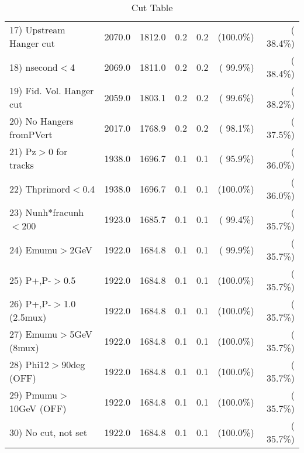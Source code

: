 \begin{table}[h!]
\begin{tabular}{||l||r|r|r|r|r|r||}
 17) Upstream Hanger cut  &       2070.0 &       1812.0 &          0.2 &          0.2 & (100.0\%) & ( 38.4\%) \\
 18) nsecond$<$4          &       2069.0 &       1811.0 &          0.2 &          0.2 & ( 99.9\%) & ( 38.4\%) \\
 19) Fid. Vol. Hanger cut &       2059.0 &       1803.1 &          0.2 &          0.2 & ( 99.6\%) & ( 38.2\%) \\
 20) No Hangers fromPVert &       2017.0 &       1768.9 &          0.2 &          0.2 & ( 98.1\%) & ( 37.5\%) \\
 21) Pz$>$0 for tracks    &       1938.0 &       1696.7 &          0.1 &          0.1 & ( 95.9\%) & ( 36.0\%) \\
 22) Thprimord$<$0.4      &       1938.0 &       1696.7 &          0.1 &          0.1 & (100.0\%) & ( 36.0\%) \\
 23) Nunh*fracunh$<$200   &       1923.0 &       1685.7 &          0.1 &          0.1 & ( 99.4\%) & ( 35.7\%) \\
 24) Emumu$>$2GeV         &       1922.0 &       1684.8 &          0.1 &          0.1 & ( 99.9\%) & ( 35.7\%) \\
 25) P+,P-$>$0.5          &       1922.0 &       1684.8 &          0.1 &          0.1 & (100.0\%) & ( 35.7\%) \\
 26) P+,P-$>$1.0 (2.5mux) &       1922.0 &       1684.8 &          0.1 &          0.1 & (100.0\%) & ( 35.7\%) \\
 27) Emumu$>$5GeV  (8mux) &       1922.0 &       1684.8 &          0.1 &          0.1 & (100.0\%) & ( 35.7\%) \\
 28) Phi12$>$90deg  (OFF) &       1922.0 &       1684.8 &          0.1 &          0.1 & (100.0\%) & ( 35.7\%) \\
 29) Pmumu$>$10GeV  (OFF) &       1922.0 &       1684.8 &          0.1 &          0.1 & (100.0\%) & ( 35.7\%) \\
 30) No cut, not set      &       1922.0 &       1684.8 &          0.1 &          0.1 & (100.0\%) & ( 35.7\%) \\
 \hline
 \hline
 \end{tabular}
 \caption{Cut Table           }
 \label{tab-cutcohjpsi-mumu_jpsi}
 \end{table}
